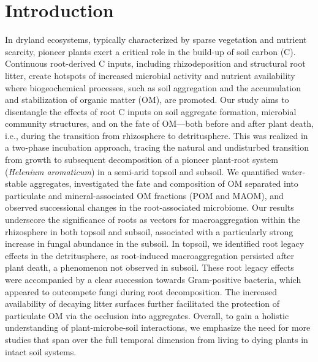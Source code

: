 \section{Introduction}

In dryland ecosystems, typically characterized by sparse vegetation and nutrient scarcity, pioneer plants exert a critical role in the build-up of soil carbon (C). Continuous root-derived C inputs, including rhizodeposition and structural root litter, create hotspots of increased microbial activity and nutrient availability where biogeochemical processes, such as soil aggregation and the accumulation and stabilization of organic matter (OM), are promoted. Our study aims to disentangle the effects of root C inputs on soil aggregate formation, microbial community structures, and on the fate of OM---both before and after plant death, i.e., during the transition from rhizosphere to detritusphere. This was realized in a two-phase incubation approach, tracing the natural and undisturbed transition from growth to subsequent decomposition of a pioneer plant-root system (\textit{Helenium aromaticum}) in a semi-arid topsoil and subsoil. We quantified water-stable aggregates, investigated the fate and composition of OM separated into particulate and mineral-associated OM fractions (POM and MAOM), and observed successional changes in the root-associated microbiome. Our results underscore the significance of roots as vectors for macroaggregation within the rhizosphere in both topsoil and subsoil, associated with a particularly strong increase in fungal abundance in the subsoil. In topsoil, we identified root legacy effects in the detritusphere, as root-induced macroaggregation persisted after plant death, a phenomenon not observed in subsoil. These root legacy effects were accompanied by a clear succession towards Gram-positive bacteria, which appeared to outcompete fungi during root decomposition. The increased availability of decaying litter surfaces further facilitated the protection of particulate OM via the occlusion into aggregates. Overall, to gain a holistic understanding of plant-microbe-soil interactions, we emphasize the need for more studies that span over the full temporal dimension from living to dying plants in intact soil systems.

